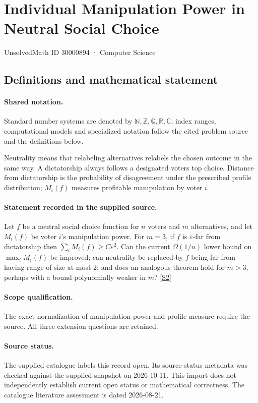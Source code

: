 \documentclass[11pt]{article}
\newcommand{\sref}[2]{\hyperlink{source:#1:#2}{[S#2]}}
\begin{document}
\setcounter{section}{30000893}
\section{Individual Manipulation Power in Neutral Social Choice}\label{30000894}
{\small\sffamily UnsolvedMath ID 30000894 · Computer Science}
\subsection{Definitions and mathematical statement}

\paragraph{Shared notation.}Standard number systems are denoted by $\mathbb N,\mathbb Z,\mathbb Q,\mathbb R,\mathbb C$; index ranges, computational models and specialized notation follow the cited problem source and the definitions below.


Neutrality means that relabeling alternatives relabels the chosen outcome in the same way. A dictatorship always follows a designated voter\textquotesingle s top choice. Distance from dictatorship is the probability of disagreement under the prescribed profile distribution; $M_i(f)$ measures profitable manipulation by voter $i$.
\paragraph{Statement recorded in the supplied source.}
Let $f$ be a neutral social choice function for $n$ voters and $m$ alternatives, and let $M_i(f)$ be voter $i$'s manipulation power. For $m=3$, if $f$ is $\varepsilon$-far from dictatorship then $\sum_iM_i(f)\geq C\varepsilon^2$. Can the current $\Omega(1/n)$ lower bound on $\max_iM_i(f)$ be improved; can neutrality be replaced by $f$ being far from having range of size at most 2; and does an analogous theorem hold for $m>3$, perhaps with a bound polynomially weaker in $m$? \sref{30000894}{2}
\paragraph{Scope qualification.}
The exact normalization of manipulation power and profile measure require the source. All three extension questions are retained.
\paragraph{Source status.}
The supplied catalogue labels this record open. Its source-status metadata was checked against the supplied snapshot on 2026-10-11. This import does not independently establish current open status or mathematical correctness. The catalogue literature assessment is dated 2026-08-21.
\end{document}

